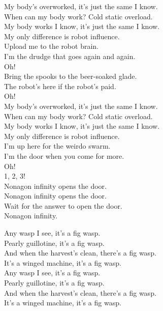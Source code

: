 My body's overworked, it's just the same I know. \\
When can my body work? Cold static overload. \\
My body works I know, it's just the same I know. \\
My only difference is robot influence. \\

Upload me to the robot brain. \\
I'm the drudge that goes again and again. \\
Oh! \\

Bring the spooks to the beer-soaked glade. \\
The robot's here if the robot's paid. \\
Oh! \\

My body's overworked, it's just the same I know. \\
When can my body work? Cold static overload. \\
My body works I know, it's just the same I know. \\
My only difference is robot influence. \\

I'm up here for the weirdo swarm. \\
I'm the door when you come for more. \\
Oh! \\

1, 2, 3! \\

Nonagon infinity opens the door. \\
Nonagon infinity opens the door. \\
Wait for the answer to open the door. \\
Nonagon infinity. \\




Any wasp I see, it's a fig wasp. \\
Pearly guillotine, it's a fig wasp. \\
And when the harvest's clean, there's a fig wasp. \\
It's a winged machine, it's a fig wasp. \\

Any wasp I see, it's a fig wasp. \\
Pearly guillotine, it's a fig wasp. \\
And when the harvest's clean, there's a fig wasp. \\
It's a winged machine, it's a fig wasp. \\

